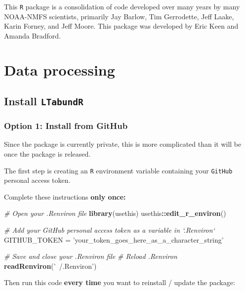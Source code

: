 \documentclass[
]{book}
\newenvironment{Shaded}{\begin{snugshade}}{\end{snugshade}}
\newcommand{\CommentTok}[1]{\textcolor[rgb]{0.56,0.35,0.01}{\textit{#1}}}
\newcommand{\KeywordTok}[1]{\textcolor[rgb]{0.13,0.29,0.53}{\textbf{#1}}}
\newcommand{\NormalTok}[1]{#1}
\newcommand{\OperatorTok}[1]{\textcolor[rgb]{0.81,0.36,0.00}{\textbf{#1}}}
\newcommand{\StringTok}[1]{\textcolor[rgb]{0.31,0.60,0.02}{#1}}
\begin{document}
This \texttt{R} package is a consolidation of code developed over many years by many NOAA-NMFS scientists, primarily Jay Barlow, Tim Gerrodette, Jeff Laake, Karin Forney, and Jeff Moore. This package was developed by Eric Keen and Amanda Bradford.

\hypertarget{part-data-processing}{%
\part{Data processing}\label{part-data-processing}}

\hypertarget{install}{%
\chapter{\texorpdfstring{Install \texttt{LTabundR}}{Install LTabundR}}\label{install}}

\hypertarget{option-1-install-from-github}{%
\section*{Option 1: Install from GitHub}\label{option-1-install-from-github}}

Since the package is currently private, this is more complicated than it will be once the package is released.

The first step is creating an \texttt{R} environment variable containing your \texttt{GitHub} personal access token.

Complete these instructions \textbf{only once:}

\begin{Shaded}
\begin{Highlighting}[]
\CommentTok{# Open your .Renviron file}
\KeywordTok{library}\NormalTok{(usethis)}
\NormalTok{usethis}\OperatorTok{::}\KeywordTok{edit_r_environ}\NormalTok{()}

\CommentTok{# Add your GitHub personal access token as a variable in `.Renviron`}
\NormalTok{GITHUB_TOKEN =}\StringTok{ 'your_token_goes_here_as_a_character_string'}

\CommentTok{# Save and close your .Renviron file}
\CommentTok{# Reload .Renviron}
\KeywordTok{readRenviron}\NormalTok{(}\StringTok{'~/.Renviron'}\NormalTok{)}
\end{Highlighting}
\end{Shaded}

Then run this code \textbf{every time} you want to reinstall / update the package:
\end{document}
